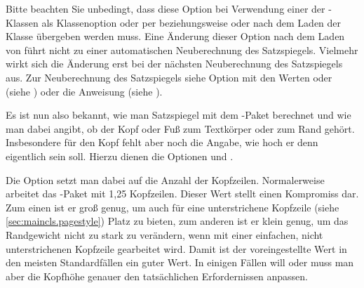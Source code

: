 Bitte beachten Sie unbedingt, dass diese Option bei
Verwendung einer der \KOMAScript-Klassen als Klassenoption oder per
 beziehungsweise oder
 nach dem Laden der Klasse übergeben werden
muss. Eine Änderung dieser Option nach dem Laden von  führt
nicht zu einer automatischen
Neuberechnung des Satzspiegels. Vielmehr wirkt sich die Änderung erst bei der
nächsten Neuberechnung des Satzspiegels aus. Zur Neuberechnung des
Satzspiegels siehe Option
\hyperref[desc:\LabelBase.option.DIV.last]{} mit den Werten
\hyperref[desc:\LabelBase.option.DIV.last]{} oder
\hyperref[desc:\LabelBase.option.DIV.current]{} (siehe
) oder die Anweisung
 (siehe
).%
%
\EndIndexGroup


\begin{Declaration}
\end{Declaration}%
%
Es ist nun also bekannt, wie man Satzspiegel mit dem -Paket
berechnet und wie man dabei angibt, ob der Kopf oder Fuß zum Textkörper oder
zum Rand gehört. Insbesondere für den Kopf fehlt aber noch die Angabe, wie
hoch er denn eigentlich sein soll. Hierzu dienen die Optionen
 und
.

Die Option  setzt man dabei
auf die Anzahl der Kopfzeilen.  Normalerweise arbeitet das
-Paket mit 1,25 Kopfzeilen. Dieser Wert stellt einen
Kompromiss dar. Zum einen ist er groß genug, um auch für eine unterstrichene
Kopfzeile (siehe \autoref{sec:maincls.pagestyle}) Platz zu bieten, zum anderen
ist er klein genug, um das Randgewicht nicht zu stark zu verändern, wenn mit
einer einfachen, nicht unterstrichenen Kopfzeile gearbeitet wird. Damit ist
der voreingestellte Wert in den meisten Standardfällen ein guter Wert.  In
einigen Fällen will oder muss man aber die Kopfhöhe genauer den tatsächlichen
Erfordernissen anpassen.

